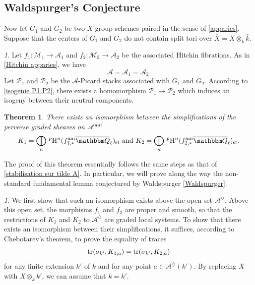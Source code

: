 \documentclass[12pt,english]{smfart}
\numberwithin{equation}{subsection}
\newtheorem{theoreme}[equation]{Theorem}
\theoremstyle{remark}
\newtheorem{numero}[equation]{}
\newcommand\calA{{\mathscr A}}
\newcommand\calP{{\mathscr P}}
\newcommand\calM{{\mathscr M}}
\newcommand\QQ{{\mathbbm Q}}
\newcommand\rmH{{\rm H}}
\newcommand\tr{{\rm tr}}
\newcommand\ovl[1]{{\overline #1}}
\newcommand\ani{{\rm ani}}
\newcommand\Ql{{\overline\QQ_\ell}}
\begin{document}
\subsection{Waldspurger's Conjecture}
\label{subsection : demo Waldspurger}

Now let $G_1$ and $G_2$ be two $X$-group schemes
paired in the sense of \ref{apparies}. Suppose that the centers of $G_1$ and
$G_2$ do not contain split tori over $\ovl
X=X\otimes_k \bar k$.

\begin{numero}
Let $f_1:\calM_1 \rightarrow \calA_1$ and $f_2:\calM_2 \rightarrow
\calA_2$ be the associated Hitchin fibrations. As in \ref{Hitchin
apparies}, we have
$$\calA=\calA_1=\calA_2.$$
Let $\calP_1$ and $\calP_2$ be the $\calA$-Picard stacks associated with
$G_1$ and $G_2$. According to \ref{isogenie P1 P2}, there exists a
homomorphism $\calP_1\rightarrow \calP_2$ which induces an isogeny
between their neutral components.
\end{numero}

\begin{theoreme}\label{pair stable}
There exists an isomorphism between the simplifications of the perverse
graded sheaves on $\calA^\ani$
$$K_1=\bigoplus_n\,^p\rmH^n (f_{1,*}^\ani\Ql)_{\rm st} \ {\rm and}\
K_2=\bigoplus_n\,^p\rmH^n (f_{2,*}^\ani\Ql)_{\rm st}.$$
\end{theoreme}

The proof of this theorem essentially follows the same
steps as that of \ref{stabilisation sur tilde A}. In particular, we
will prove along the way the non-standard fundamental lemma
conjectured by Waldspurger \ref{Waldspurger}.

\begin{numero}
We first show that such an isomorphism exists above the open set
$\calA^\diamondsuit$. Above this open set, the morphisms $f_1$ and
$f_2$ are proper and smooth, so that the restrictions of $K_1$ and $K_2$
to $\calA^\diamondsuit$ are graded local systems. To
show that there exists an isomorphism between their simplifications, it
suffices, according to Chebotarev's theorem, to prove the equality of
traces
\begin{equation}\label{egalite des traces 3}
\tr(\sigma_{k'},K_{1,a})=\tr(\sigma_{k'},K_{2,a})
\end{equation}
for any finite extension $k'$ of $k$ and for any point $a\in
\calA^\diamondsuit(k')$. By replacing $X$ with $X\otimes_k k'$, we can
assume that $k=k'$.
\end{numero}
\end{document}

